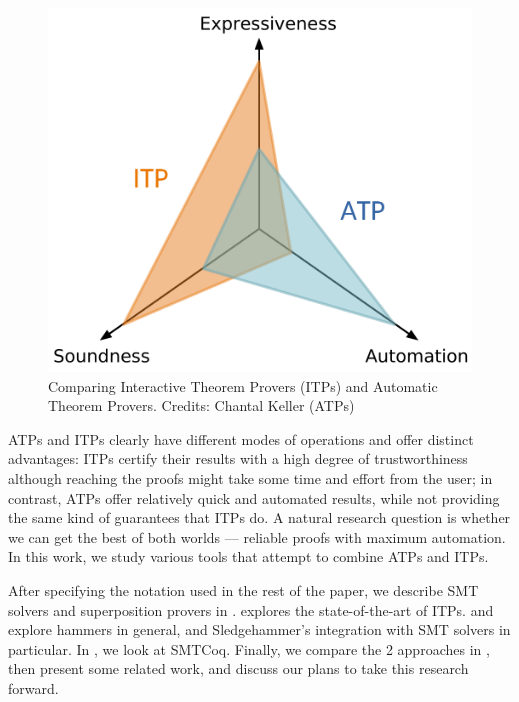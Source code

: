 \documentclass{article}
\begin{document}
	\begin{figure}[t]
		\centering
		\includegraphics[scale=0.5]{coq.pdf}
		\caption{Comparing Interactive Theorem Provers 
		(ITPs) and Automatic Theorem Provers. Credits: 
		Chantal Keller (ATPs)}
		\label{fig:graph}
	\end{figure}

	ATPs and ITPs clearly have different modes of 
	operations and offer distinct advantages: ITPs 
	certify their results with a high degree of 
	trustworthiness although reaching the proofs might 
	take some time and effort from the user; in contrast, 
	ATPs offer relatively quick and automated results, 
	while not providing the same kind of guarantees that 
	ITPs do. A natural research question is whether we 
	can get the best of both worlds --- reliable proofs 
	with maximum automation. In this work, we study 
	various tools that attempt to combine ATPs and ITPs.
	
	After specifying the notation used in the rest of 
	the paper, we describe SMT solvers and superposition 
	provers in .
	 explores the state-of-the-art 
	of ITPs.  and 
		explore hammers in general, 
	and Sledgehammer's integration with SMT solvers in
	particular. In , we look at SMTCoq. 
	Finally, we compare the 2 approaches in 
	, then present some related work, 
	and discuss our plans to take this research forward.
\end{document}
